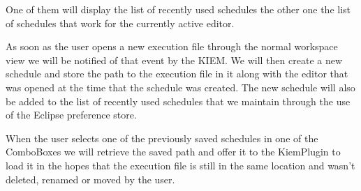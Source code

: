 One of them will display the list of recently used schedules the other one the
list of schedules that work for the currently active editor.

As soon as the user opens a new execution file through the normal workspace
view we will be notified of that event by the \ac{KIEM}. We will then create a new
schedule and store the path to the execution file in it along with the editor
that was opened at the time that the schedule was created. The new schedule will
also be added to the list of recently used schedules that we maintain through the 
use of the Eclipse preference store.

When the user selects one of the previously saved schedules in one of the
ComboBoxes we will retrieve the saved path and offer it to the KiemPlugin to
load it in the hopes that the execution file is still in the same location and
wasn't deleted, renamed or moved by the user.


